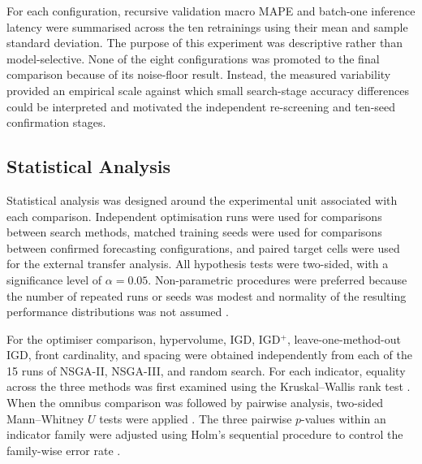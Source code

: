 \documentclass[a4paper,fleqn]{cas-sc}
\begin{document}
For each configuration, recursive validation macro MAPE and batch-one inference latency were summarised across the ten retrainings using their mean and sample standard deviation. The purpose of this experiment was descriptive rather than model-selective. None of the eight configurations was promoted to the final comparison because of its noise-floor result. Instead, the measured variability provided an empirical scale against which small search-stage accuracy differences could be interpreted and motivated the independent re-screening and ten-seed confirmation stages.


\subsection{Statistical Analysis}
\label{sec:statistical_analysis}

Statistical analysis was designed around the experimental unit associated with each comparison. Independent optimisation runs were used for comparisons between search methods, matched training seeds were used for comparisons between confirmed forecasting configurations, and paired target cells were used for the external transfer analysis. All hypothesis tests were two-sided, with a significance level of $\alpha=0.05$. Non-parametric procedures were preferred because the number of repeated runs or seeds was modest and normality of the resulting performance distributions was not assumed \cite{derrac2011nonparam,latorre2021guidelines}.


For the optimiser comparison, hypervolume, IGD, IGD$^{+}$, leave-one-method-out IGD, front cardinality, and spacing were obtained independently from each of the 15 runs of NSGA-II, NSGA-III, and random search. For each indicator, equality across the three methods was first examined using the Kruskal--Wallis rank test \cite{kruskal1952ranks}. When the omnibus comparison was followed by pairwise analysis, two-sided Mann--Whitney $U$ tests were applied \cite{mann1947test}. The three pairwise $p$-values within an indicator family were adjusted using Holm's sequential procedure to control the family-wise error rate \cite{holm1979procedure}.
\end{document}
